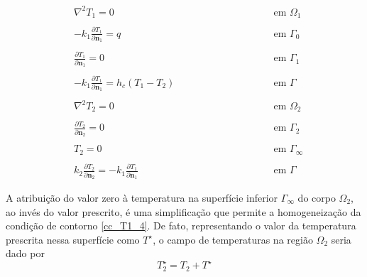 \begin{subequations}
\begin{alignat}{2}
	& \nabla^2 T_1 = 0 \quad\quad\quad\quad\quad && \text{ em } \Omega_1 \label{harm_T1} \\ \nonumber \\
	& -k_1 \frac{\partial T_1}{\partial\mathbf{n}_1} = q && \text{ em } \Gamma_0  \label{cc_T1_2} \\ \nonumber \\
	& \frac{\partial T_1}{\partial \mathbf{n}_1} = 0 && \text{ em }  \Gamma_1 \label{cc_T1_1} \\ \nonumber \\
	& -k_1 \frac{\partial T_1}{\partial\mathbf{n}_1} = h_c(T_1-T_2) \quad\quad\quad\quad\quad\quad\quad\quad && \text{ em }  \Gamma \label{cc_grad_T1} \\ \nonumber \\
	& \nabla^2 T_2 = 0 && \text{ em }  \Omega_2 \label{harm_T2} \\ \nonumber \\
	& \frac{\partial T_2}{\partial \mathbf{n}_2} = 0 && \text{ em }  \Gamma_2 \label{cc_T1_3} \\ \nonumber \\
	& T_2 = 0 && \text{ em }  \Gamma_\infty \label{cc_T1_4} \\ \nonumber \\
	& k_2\frac{\partial T_2}{\partial\mathbf{n}_2} = - k_1\frac{\partial T_1}{\partial\mathbf{n}_1} && \text{ em }  \Gamma \label{cc_T1_5}
\end{alignat}
\end{subequations}

A atribuição do valor zero à temperatura na superfície inferior $\Gamma_\infty$ do corpo $\Omega_2$, ao invés do valor prescrito, é uma simplificação
que permite a homogeneização da condição de contorno \eqref{cc_T1_4}. De fato, representando o valor da temperatura prescrita nessa superfície como $T^\star$,
o campo de temperaturas na região $\Omega_2$ seria dado por
\begin{equation}
	T_2^\star = T_2 + T^\star
\end{equation}
